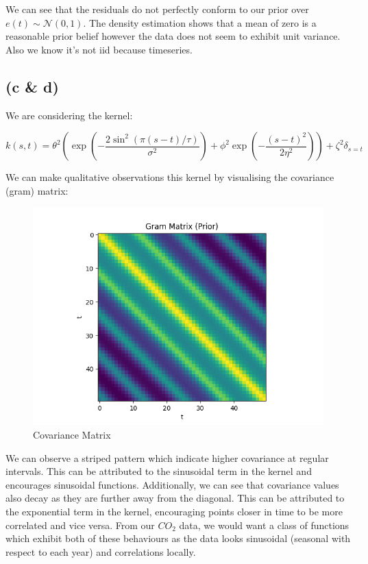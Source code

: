 \documentclass[12pt]{article}
\begin{document}
We can see that the residuals do not perfectly conform to our prior over $e(t) \sim \mathcal{N}(0, 1)$.
The density estimation shows that a mean of zero is a reasonable prior belief however the data does not seem to exhibit unit variance.
Also we know it's not iid because timeseries.

\newpage
\subsection*{(c \& d)}

We are considering the kernel:

\[k(s, t) = \theta^2 \left( \exp\left( - \frac{2\sin^2(\pi(s-t)/\tau)}{\sigma^2}\right) + \phi^2 \exp\left( - \frac{(s-t)^2}{2\eta^2}\right)\right) + \zeta^2 \delta_{s=t}\]

We can make qualitative observations this kernel by visualising the covariance (gram) matrix:

\begin{figure}[h]
\centering
\includegraphics[scale=0.5]{outputs/q2/c-gram-matrix}
\caption{Covariance Matrix}
\label{fig:c-gram-matrix}
\end{figure}

We can observe a striped pattern which indicate higher covariance at regular intervals.
This can be attributed to the sinusoidal term in the kernel and encourages sinusoidal functions.
Additionally, we can see that covariance values also decay as they are further away from the diagonal.
This can be attributed to the exponential term in the kernel, encouraging points closer in time to be more correlated and vice versa.
From our $CO_2$ data, we would want a class of functions which exhibit both of these behaviours as the data looks sinusoidal (seasonal with respect to each year) and correlations locally.
\end{document}
